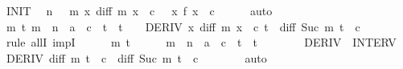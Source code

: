 \begin{isabellebody}
\ INIT\ \isamarkupfalse%
\ {\isachardoublequoteopen}n\ {\isachargreater}{\kern0pt}\ {}{\isachardoublequoteclose}\ {\isachardoublequoteopen}{\isacharparenleft}{\kern0pt}{\isasymlambda}m\ x{\isachardot}{\kern0pt}\ diff\ m\ {\isacharparenleft}{\kern0pt}x\ {\isacharplus}{\kern0pt}\ c{\isacharparenright}{\kern0pt}{\isacharparenright}{\kern0pt}\ {}\ {\isacharequal}{\kern0pt}\ {\isacharparenleft}{\kern0pt}{\isasymlambda}x{\isachardot}{\kern0pt}\ f\ {\isacharparenleft}{\kern0pt}x\ {\isacharplus}{\kern0pt}\ c{\isacharparenright}{\kern0pt}{\isacharparenright}{\kern0pt}{\isachardoublequoteclose}\isanewline
\ \ \ \ \isamarkupfalse%
\ auto\isanewline
\ \ \isamarkupfalse%
\isanewline
\ \ \isamarkupfalse%
\ {\isachardoublequoteopen}{\isasymforall}m\ t{\isachardot}{\kern0pt}\ m\ {\isacharless}{\kern0pt}\ n\ {\isasymand}\ a\ {\isacharminus}{\kern0pt}\ c\ {\isasymle}\ t\ {\isasymand}\ t\ {\isasymle}\ {}\ {\isasymlongrightarrow}\ DERIV\ {\isacharparenleft}{\kern0pt}{\isasymlambda}x{\isachardot}{\kern0pt}\ diff\ m\ {\isacharparenleft}{\kern0pt}x\ {\isacharplus}{\kern0pt}\ c{\isacharparenright}{\kern0pt}{\isacharparenright}{\kern0pt}\ t\ {\isacharcolon}{\kern0pt}{\isachargreater}{\kern0pt}\ diff\ {\isacharparenleft}{\kern0pt}Suc\ m{\isacharparenright}{\kern0pt}\ {\isacharparenleft}{\kern0pt}t\ {\isacharplus}{\kern0pt}\ c{\isacharparenright}{\kern0pt}{\isachardoublequoteclose}\isanewline
\ \ \isamarkupfalse%
\ {\isacharparenleft}{\kern0pt}rule\ allI\ impI{\isacharparenright}{\kern0pt}{\isacharplus}{\kern0pt}\isanewline
\ \ \ \ \isamarkupfalse%
\ m\ t\isanewline
\ \ \ \ \isamarkupfalse%
\ {\isachardoublequoteopen}m\ {\isacharless}{\kern0pt}\ n\ {\isasymand}\ a\ {\isacharminus}{\kern0pt}\ c\ {\isasymle}\ t\ {\isasymand}\ t\ {\isasymle}\ {}{\isachardoublequoteclose}\isanewline
\ \ \ \ \isamarkupfalse%
\ DERIV\ \ INTERV\ \isamarkupfalse%
\ {\isachardoublequoteopen}DERIV\ {\isacharparenleft}{\kern0pt}diff\ m{\isacharparenright}{\kern0pt}\ {\isacharparenleft}{\kern0pt}t\ {\isacharplus}{\kern0pt}\ c{\isacharparenright}{\kern0pt}\ {\isacharcolon}{\kern0pt}{\isachargreater}{\kern0pt}\ diff\ {\isacharparenleft}{\kern0pt}Suc\ m{\isacharparenright}{\kern0pt}\ {\isacharparenleft}{\kern0pt}t\ {\isacharplus}{\kern0pt}\ c{\isacharparenright}{\kern0pt}{\isachardoublequoteclose}\isanewline
\ \ \ \ \ \ \isamarkupfalse%
\ auto\isanewline
\ \ \ \ \isamarkupfalse%

\end{isabellebody}
